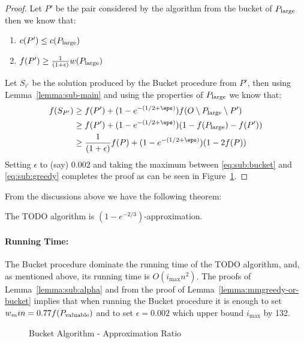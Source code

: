\begin{proof}
	Let $P'$ be the pair considered by the algorithm from the bucket of $P_{\text{large}}$ then we know that:
	\begin{enumerate}
		\item $c(P') \leq c(P_{\text{large}})$
		\item $f(P') \geq \frac{1}{(1 + \epsilon)}w(P_{\text{large}})$
	\end{enumerate}
	Let $S_{i'}$ be the solution produced by the Bucket procedure from $P'$,
	then using Lemma~\ref{lemma:sub-main} and using the properties of $P_{\text{large}}$ we know that:
	\begin{align}
		f(S_{P'}) 
		& 
		\geq f(P') + (1-e^{-(1/2 + \eps)})f(O \setminus \pLarge \setminus P')
		\\ & 
		\geq f(P') + (1-e^{-(1/2 + \eps)})(1 - f(\pLarge) - f(P'))
		\\ & 
		\geq \frac{1}{(1 + \epsilon)}f(P) + (1-e^{-(1/2 + \eps)})(1 - 2f(P))
		\label{eq:sub:bucket}
	\end{align}
	Setting $\epsilon$ to (say) $0.002$ and taking the maximum between \ref{eq:sub:bucket} and
	\ref{eq:sub:greedy} completes the proof as can be seen in Figure~\ref{fig:sub:bucket}.
\end{proof}

From the discussions above we have the following theorem:

\begin{theorem}
	The TODO algorithm is $(1 - e^{-2/3})$-approximation.
\end{theorem}

\paragraph{Running Time:}
The Bucket procedure dominate the running time of the TODO algorithm, and, as mentioned above, its running time is $O(i_{\max}n^2)$.
The proofs of Lemma~\ref{lemma:sub:alpha} and from the proof of Lemma~\ref{lemma:mmgreedy-or-bucket} implies that when running the Bucket procedure it is enough to set $w_min = 0.77f(P_{\text{valuable}})$ and to set $\epsilon = 0.002$ which upper bound $i_{\max}$ by 132.

\begin{figure}
	\def\zeta{0.002}
	\caption{
		\label{fig:sub:bucket}
		Bucket Algorithm - Approximation Ratio
	}
\end{figure}
